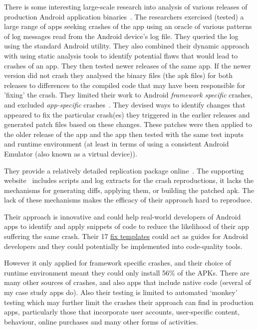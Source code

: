 There is some interesting large-scale research into analysis of various releases of production Android application binaries~. The researchers exercised (tested) a large range of apps seeking crashes of the app using an oracle of various patterns of log messages read from the Android device's log file. They queried the log using the standard Android  utility. They also combined their dynamic approach with using static analysis tools to identify potential flaws that would lead to crashes of an app. They then tested newer releases of the same app. If the newer version did not crash they analysed the binary files (the \Gls{apk} 
files) for both releases to differences to the compiled code that may have been responsible for 'fixing' the crash. They limited their work to Android \emph{framework specific} crashes, and excluded \emph{app-specific} crashes~. They devised ways to identify changes that appeared to fix the particular crash(es) they triggered in the earlier releases and generated patch files based on these changes. These patches were then applied to the older release of the app and the app then tested with the same test inputs and runtime environment (at least in terms of using a consistent Android Emulator (also known as a virtual device)). 

They provide a relatively detailed replication package online~. The supporting website~ includes scripts and log extracts for the crash reproductions, it lacks the mechanisms for generating diffs, applying them, or building the patched \Gls{apk}. The lack of these mechanisms makes the efficacy of their approach hard to reproduce.

Their approach is innovative and could help real-world developers of Android apps to identify and apply snippets of code to reduce the likelihood of their app suffering the same crash. Their 17 \href{https://github.com/CraftDroid/ExpData/tree/master/Fix_Templates}{fix templates} could act as guides for Android developers and they could potentially be implemented into code-quality tools.
    
However it only applied for framework specific crashes, and their choice of runtime environment meant they could only install 56\% of the APKs. There are many other sources of crashes, and also apps that include native code (several of my case study apps do). Also their testing is limited to automated `monkey' testing which may further limit the crashes their approach can find in production apps, particularly those that incorporate user accounts, user-specific content, behaviour, online purchases and many other forms of activities.

